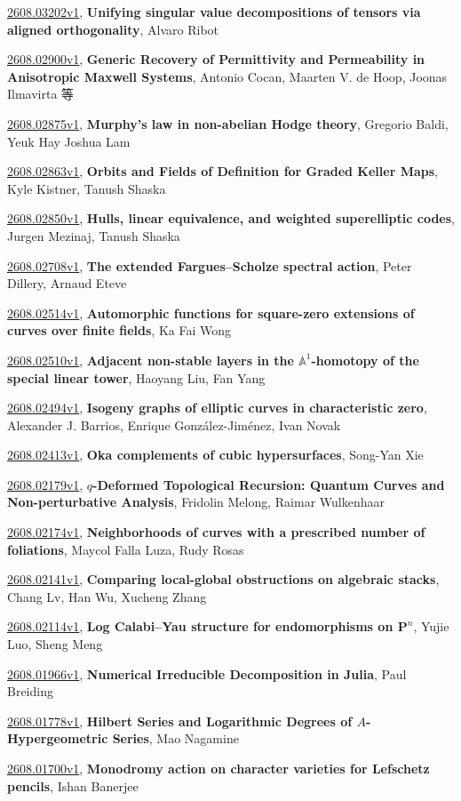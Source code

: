 \documentclass[9pt, a4paper]{article}
\theoremstyle{plain}
\theoremstyle{definition}
\theoremstyle{remark}
\newcommand{\arxiv}[3]{\href{https://arxiv.org/abs/#1}{#1}, \textbf{\textcolor{arxivblue}{#2}}, #3}
\begin{document}
\arxiv{2608.03202v1}{Unifying singular value decompositions of tensors via aligned orthogonality}{Alvaro Ribot}

\arxiv{2608.02900v1}{Generic Recovery of Permittivity and Permeability in Anisotropic Maxwell Systems}{Antonio Cocan, Maarten V. de Hoop, Joonas Ilmavirta 等}

\arxiv{2608.02875v1}{Murphy's law in non-abelian Hodge theory}{Gregorio Baldi, Yeuk Hay Joshua Lam}

\arxiv{2608.02863v1}{Orbits and Fields of Definition for Graded Keller Maps}{Kyle Kistner, Tanush Shaska}

\arxiv{2608.02850v1}{Hulls, linear equivalence, and weighted superelliptic codes}{Jurgen Mezinaj, Tanush Shaska}

\arxiv{2608.02708v1}{The extended Fargues--Scholze spectral action}{Peter Dillery, Arnaud Eteve}

\arxiv{2608.02514v1}{Automorphic functions for square-zero extensions of curves over finite fields}{Ka Fai Wong}

\arxiv{2608.02510v1}{Adjacent non-stable layers in the $\mathbb{A}^1$-homotopy of the special linear tower}{Haoyang Liu, Fan Yang}

\arxiv{2608.02494v1}{Isogeny graphs of elliptic curves in characteristic zero}{Alexander J. Barrios, Enrique González-Jiménez, Ivan Novak}

\arxiv{2608.02413v1}{Oka complements of cubic hypersurfaces}{Song-Yan Xie}

\arxiv{2608.02179v1}{$q$-Deformed Topological Recursion: Quantum Curves and Non-perturbative Analysis}{Fridolin Melong, Raimar Wulkenhaar}

\arxiv{2608.02174v1}{Neighborhoods of curves with a prescribed number of foliations}{Maycol Falla Luza, Rudy Rosas}

\arxiv{2608.02141v1}{Comparing local-global obstructions on algebraic stacks}{Chang Lv, Han Wu, Xucheng Zhang}

\arxiv{2608.02114v1}{Log Calabi--Yau structure for endomorphisms on $\mathbf{P}^n$}{Yujie Luo, Sheng Meng}

\arxiv{2608.01966v1}{Numerical Irreducible Decomposition in Julia}{Paul Breiding}

\arxiv{2608.01778v1}{Hilbert Series and Logarithmic Degrees of $A$-Hypergeometric Series}{Mao Nagamine}

\arxiv{2608.01700v1}{Monodromy action on character varieties for Lefschetz pencils}{Ishan Banerjee}
\end{document}
